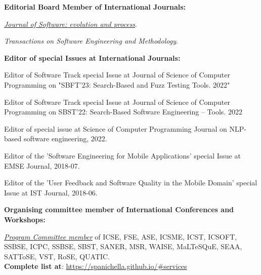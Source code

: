 \documentclass[11pt]{article}
\newcommand\on[1]{\nbc{ON}{#1}{red}} %
\begin{document}
\textbf{Editorial Board Member of International Journals:}
\begin{innerlist}
   \item \emph{
              \href{http://onlinelibrary.wiley.com/journal/10.1002/(ISSN)2047-7481��}
                   {Journal of Software: evolution and process}}.
   \item \emph{Transactions on Software Engineering and Methodology}.
\end{innerlist}
\medskip 
\textbf{Editor of special Issues at International Journals:}
\begin{innerlist}
\item Editor of Software Track special Issue at Journal of Science of Computer Programming on "SBFT'23: Search-Based and Fuzz Testing Tools. 2022"
\item Editor of Software Track special Issue at Journal of Science of Computer Programming on SBST’22: Search-Based Software Engineering – Tools. 2022
\item Editor of special issue at Science of Computer Programming Journal on NLP-based software engineering, 2022.
\item Editor of the 'Software Engineering for Mobile Applications' special Issue at EMSE Journal, 2018-07.
\item Editor of the 'User Feedback and Software Quality in the Mobile Domain' special Issue at IST Journal,  2018-06.
	
\end{innerlist}
\medskip 
\textbf{Organising committee member of International Conferences and Workshops:}
\begin{innerlist}
 \item \href{https://spanichella.github.io/#services}{\textit{Program Committee member}} of ICSE, FSE, ASE, ICSME, ICST, ICSOFT, SSBSE, ICPC, SSBSE, SBST, SANER, MSR, WAISE, MaLTeSQuE, SEAA, SATToSE, VST, RoSE, QUATIC. \\\textbf{Complete list at}: \href{https://spanichella.github.io/\#services}{https://spanichella.github.io/\#services}
 \end{innerlist}


\end{document}
